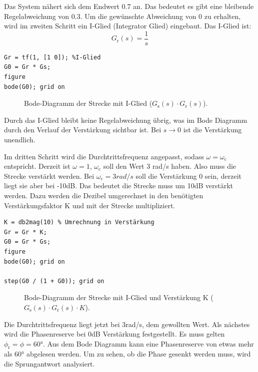 \documentclass[11pt,a4paper]{article}
\newlength\figureheight
\newlength\figurewidth
\begin{document}
\noindent Das System nähert sich dem Endwert 0.7 an. Das bedeutet es gibt eine bleibende Regelabweichung von 0.3. Um die gewünschte Abweichung von 0 zu erhalten, wird im zweiten Schritt ein I-Glied (Integrator Glied) eingebaut. Das I-Glied ist:
$$G_{\mathrm{r}}(s) = \frac{1}{s}$$

\begin{lstlisting}
Gr = tf(1, [1 0]); %I-Glied
G0 = Gr * Gs;
figure
bode(G0); grid on
\end{lstlisting}

\begin{figure}[H]
    \centering
    \setlength\figureheight{6cm}
    \setlength{} %
    
    
    
    \caption{Bode-Diagramm der Strecke mit I-Glied ($G_{\mathrm{s}}(s) \cdot G_{\mathrm{r}}(s)$).}
    \label{fig:matlab_plot3}
\end{figure}

\noindent Durch das I-Glied bleibt keine Regelabweichung übrig, was im Bode Diagramm durch den Verlauf der Verstärkung sichtbar ist. Bei $s \to 0$ ist die Verstärkung unendlich.

\noindent Im dritten Schritt wird die Durchtrittsfrequenz angepasst, sodass $\omega = \omega_{\mathrm{c}}$ entspricht. Derzeit ist $\omega = 1$, $\omega_{\mathrm{c}}$ soll den Wert 3 rad/s haben. Also muss die Strecke verstärkt werden. Bei $\omega_{\mathrm{c}} = 3rad/s$ soll die Verstärkung 0 sein, derzeit liegt sie aber bei -10dB. Das bedeutet die Strecke muss um 10dB verstärkt werden. Dazu werden die Dezibel umgerechnet in den benötigten Verstärkungsfaktor K und mit der Strecke multipliziert.

\begin{lstlisting}
K = db2mag(10) % Umrechnung in Verstärkung
Gr = Gr * K;
G0 = Gr * Gs;
figure
bode(G0); grid on

step(G0 / (1 + G0)); grid on
\end{lstlisting}

\begin{figure}[H]
    \centering
    \setlength\figureheight{6cm}
    \setlength{} %
    
    
    
    \caption{Bode-Diagramm der Strecke mit I-Glied und Verstärkung K ($G_{\mathrm{s}}(s) \cdot G_{\mathrm{r}}(s) \cdot K$).}
    \label{fig:matlab_plot4}
\end{figure}
\noindent Die Durchtrittsfrequenz liegt jetzt bei 3rad/s, dem gewollten Wert. Als nächstes wird die Phasenreserve bei 0dB Verstärkung festgestellt. Es muss gelten $\phi_{\mathrm{r}} = \phi = 60°$. Aus dem Bode Diagramm kann eine Phasenreserve von etwas mehr als 60° abgelesen werden. Um zu sehen, ob die Phase gesenkt werden muss, wird die Sprungantwort analysiert.
\end{document}
